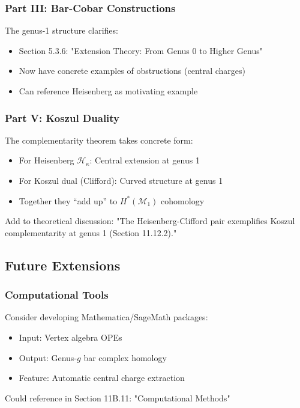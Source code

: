 \subsubsection{Part III: Bar-Cobar Constructions}

The genus-1 structure clarifies:
\begin{itemize}
\item Section 5.3.6: "Extension Theory: From Genus 0 to Higher Genus"
\item Now have concrete examples of obstructions (central charges)
\item Can reference Heisenberg as motivating example
\end{itemize}

\subsubsection{Part V: Koszul Duality}

The complementarity theorem takes concrete form:
\begin{itemize}
\item For Heisenberg $\mathcal{H}_\kappa$: Central extension at genus 1
\item For Koszul dual (Clifford): Curved structure at genus 1  
\item Together they ``add up'' to $H^*(\mathcal{M}_1)$ cohomology
\end{itemize}

Add to theoretical discussion: "The Heisenberg-Clifford pair exemplifies Koszul complementarity at genus 1 (Section 11.12.2)."

\subsection{Future Extensions}

\subsubsection{Computational Tools}

Consider developing Mathematica/SageMath packages:
\begin{itemize}
\item Input: Vertex algebra OPEs
\item Output: Genus-$g$ bar complex homology
\item Feature: Automatic central charge extraction
\end{itemize}

Could reference in Section 11B.11: "Computational Methods"

